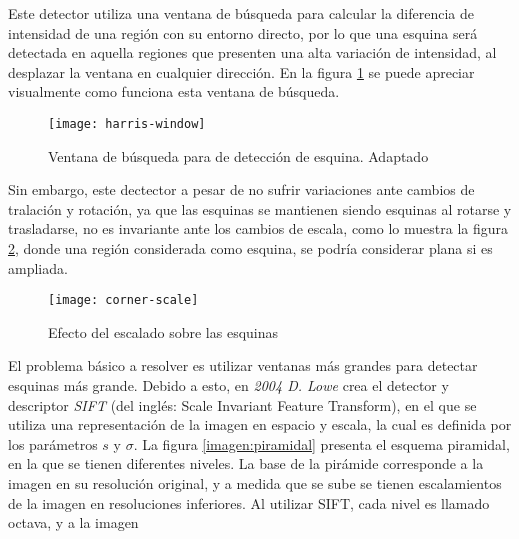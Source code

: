 Este detector utiliza una ventana de búsqueda para calcular la diferencia de intensidad de una región con su entorno directo, por lo que una esquina  será detectada en aquella regiones que presenten una alta variación de intensidad, al desplazar la ventana en cualquier dirección. En la figura \ref{imagen:harris-window} se puede apreciar visualmente como funciona esta ventana de búsqueda.

\begin{figure}[H]
	\centering
	\texttt{[image: harris-window]}
	\caption[Ventana de búsqueda para de detección de esquinas]{Ventana de búsqueda para de detección de esquina. Adaptado\protect\footnotemark}
	\label{imagen:harris-window}
\end{figure}

Sin embargo, este dectector a pesar de no sufrir variaciones ante cambios de tralación y rotación, ya que las esquinas se mantienen siendo esquinas al rotarse y trasladarse, no es invariante ante los cambios de escala, como lo muestra la figura \ref{imagen:corner-scale}, donde una región considerada como esquina, se podría considerar plana si es ampliada.


\begin{figure}[H]
	\centering
	\texttt{[image: corner-scale]}
	\caption[Efecto del escalado sobre las esquinas]{Efecto del escalado sobre las esquinas	\protect\footnotemark}
	\label{imagen:corner-scale}
\end{figure}

El problema básico a resolver es utilizar ventanas más grandes para detectar esquinas más grande. Debido a esto, en \textit{2004 D. Lowe} crea el detector y descriptor \textit{SIFT} \cite{sift} (del inglés: Scale Invariant Feature Transform), en el que se utiliza una representación de la imagen en espacio y escala, la cual es definida por los parámetros $s$ y $\sigma$. La figura \ref{imagen:piramidal} presenta el esquema piramidal, en la que se tienen diferentes niveles. La base de la pirámide corresponde a la imagen en su resolución original, y a medida que se sube se tienen escalamientos de la imagen en resoluciones inferiores. Al utilizar SIFT, cada nivel es llamado octava, y a la imagen 

